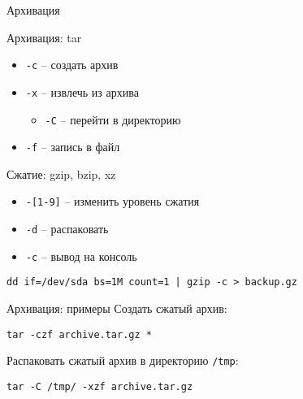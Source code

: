\begin{frame}[fragile]{Архивация}
	\begin{block}{Архивация: tar}
		\begin{itemize}
			\item {\tt -c} -- создать архив
			\item {\tt -x} -- извлечь из архива
				\begin{itemize}
					\item {\tt -C} -- перейти в директорию
				\end{itemize}
			\item {\tt -f} -- запись в файл
		\end{itemize}
	\end{block}

	\begin{block}{Сжатие: gzip, bzip, xz}
		\begin{itemize}
			\item {\tt -[1-9]} -- изменить уровень сжатия
			\item {\tt -d} -- распаковать
			\item {\tt -c} -- вывод на консоль
		\end{itemize}
		\begin{verbatim}
dd if=/dev/sda bs=1M count=1 | gzip -c > backup.gz
    \end{verbatim}
	\end{block}

\end{frame}

\begin{frame}[fragile]{Архивация: примеры}
	Создать сжатый архив:
	\begin{verbatim}
tar -czf archive.tar.gz *
        \end{verbatim}
	\pause
	Распаковать сжатый архив в директорию {\tt /tmp}:
	\begin{verbatim}
tar -C /tmp/ -xzf archive.tar.gz
        \end{verbatim}
\end{frame}
